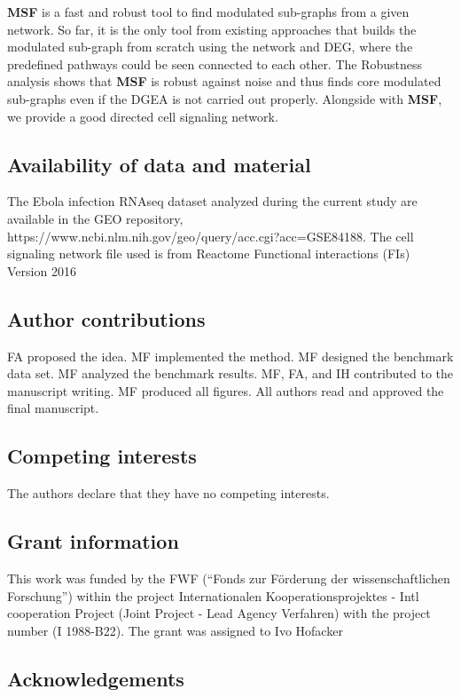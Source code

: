 \documentclass[twocolumn]{article}
\begin{document}
\textbf{MSF} is a fast and robust tool to find modulated sub-graphs from a given network. So far, it is the only tool from existing approaches that builds the modulated sub-graph from scratch using the network and DEG, where the predefined pathways could be seen connected to each other. The Robustness analysis shows that \textbf{MSF} is robust against noise and thus finds core modulated sub-graphs even if the DGEA is not carried out properly. Alongside with \textbf{MSF}, we provide a good directed cell signaling network.

\subsection*{Availability of data and material}

The Ebola infection RNAseq dataset analyzed during the current study are
available in the GEO repository, {\scriptsize
  https://www.ncbi.nlm.nih.gov/geo/query/acc.cgi?acc=GSE84188.}  The cell signaling
network file used is from Reactome Functional interactions (FIs)
Version 2016


\subsection*{Author contributions}
FA proposed the idea. MF implemented the method. MF designed the benchmark
data set. MF analyzed the benchmark results. MF, FA, and IH contributed to
the manuscript writing. MF produced all figures. All authors read and
approved the final manuscript.

\subsection*{Competing interests}

The authors declare that they have no competing interests.


\subsection*{Grant information}

This work was funded by the FWF (“Fonds zur Förderung der wissenschaftlichen Forschung”) within the project Internationalen Kooperationsprojektes - Intl cooperation Project (Joint Project - Lead Agency Verfahren) with the project number (I 1988-B22). The grant was assigned to Ivo Hofacker


\subsection*{Acknowledgements}
\end{document}

